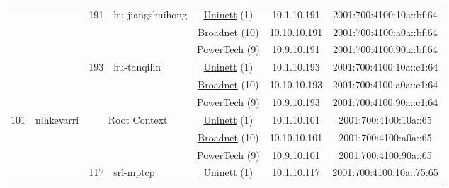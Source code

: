 \begin{small}
\begin{center}
\begin{longtable}{|c|c|c|c|c|c|c|c|}
  &  & \multirow{3}{*}{\tiny{191}} & \multicolumn{1}{|l|}{\multirow{3}{*}{\tiny{hu-jiangshuihong}}} & \multicolumn{2}{|c|}{\tiny{\href{https://www.uninett.no}{Uninett} (1)}} & \tiny{10.1.10.191} & \tiny{2001:700:4100:10a::bf:64} \\* \cline{5-5}\cline{6-6}\cline{7-7}\cline{8-8}
  &  &  &  & \multicolumn{2}{|c|}{\tiny{\href{https://www.broadnet.no}{Broadnet} (10)}} & \tiny{10.10.10.191} & \tiny{2001:700:4100:a0a::bf:64} \\* \cline{5-5}\cline{6-6}\cline{7-7}\cline{8-8}
  &  &  &  & \multicolumn{2}{|c|}{\tiny{\href{http://www.powertech.no}{PowerTech} (9)}} & \tiny{10.9.10.191} & \tiny{2001:700:4100:90a::bf:64} \\* \cline{3-3}\cline{4-4}\cline{5-5}\cline{6-6}\cline{7-7}\cline{8-8}
  &  & \multirow{3}{*}{\tiny{193}} & \multicolumn{1}{|l|}{\multirow{3}{*}{\tiny{hu-tanqilin}}} & \multicolumn{2}{|c|}{\tiny{\href{https://www.uninett.no}{Uninett} (1)}} & \tiny{10.1.10.193} & \tiny{2001:700:4100:10a::c1:64} \\* \cline{5-5}\cline{6-6}\cline{7-7}\cline{8-8}
  &  &  &  & \multicolumn{2}{|c|}{\tiny{\href{https://www.broadnet.no}{Broadnet} (10)}} & \tiny{10.10.10.193} & \tiny{2001:700:4100:a0a::c1:64} \\* \cline{5-5}\cline{6-6}\cline{7-7}\cline{8-8}
  &  &  &  & \multicolumn{2}{|c|}{\tiny{\href{http://www.powertech.no}{PowerTech} (9)}} & \tiny{10.9.10.193} & \tiny{2001:700:4100:90a::c1:64} \\ \hline
 \multirow{30}{*}{\tiny{101}} & \multicolumn{1}{|l|}{\multirow{30}{*}{\tiny{nihkevarri}}} & \multicolumn{2}{|c|}{\multirow{3}{*}{\tiny{Root Context}}} & \multicolumn{2}{|c|}{\tiny{\href{https://www.uninett.no}{Uninett} (1)}} & \tiny{10.1.10.101} & \tiny{2001:700:4100:10a::65} \\* \cline{5-5}\cline{6-6}\cline{7-7}\cline{8-8}
  &  & \multicolumn{2}{|c|}{} & \multicolumn{2}{|c|}{\tiny{\href{https://www.broadnet.no}{Broadnet} (10)}} & \tiny{10.10.10.101} & \tiny{2001:700:4100:a0a::65} \\* \cline{5-5}\cline{6-6}\cline{7-7}\cline{8-8}
  &  & \multicolumn{2}{|c|}{} & \multicolumn{2}{|c|}{\tiny{\href{http://www.powertech.no}{PowerTech} (9)}} & \tiny{10.9.10.101} & \tiny{2001:700:4100:90a::65} \\* \cline{3-3}\cline{4-4}\cline{5-5}\cline{6-6}\cline{7-7}\cline{8-8}
  &  & \multirow{3}{*}{\tiny{117}} & \multicolumn{1}{|l|}{\multirow{3}{*}{\tiny{srl-mptcp}}} & \multicolumn{2}{|c|}{\tiny{\href{https://www.uninett.no}{Uninett} (1)}} & \tiny{10.1.10.117} & \tiny{2001:700:4100:10a::75:65} \\* \cline{5-5}\cline{6-6}\cline{7-7}\cline{8-8}

\end{longtable}
\end{center}
\end{small}
